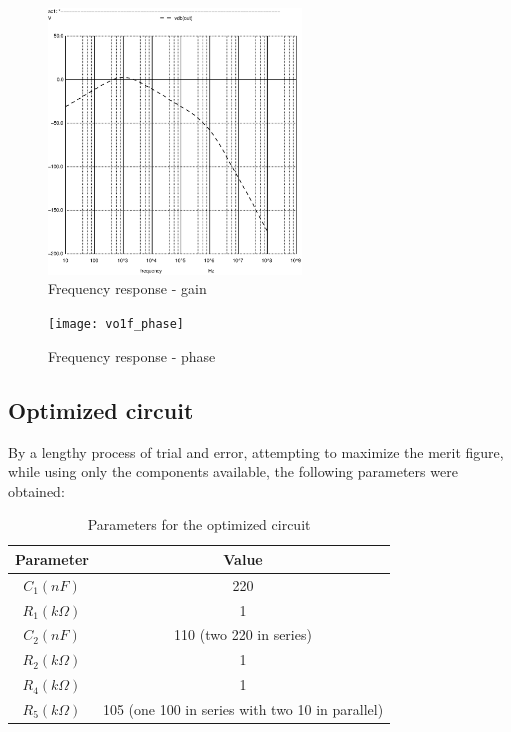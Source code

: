 \begin{figure}[H]
\centering
\includegraphics[width=0.6\textwidth]{vo1f}
\caption{Frequency response - gain}
\end{figure}

\begin{figure}[H]
\centering
\texttt{[image: vo1f\_phase]}
\caption{Frequency response - phase}
\end{figure}

\newpage

\subsection{Optimized circuit}

By a lengthy process of trial and error, attempting to maximize the merit figure, while using only the components available, the following parameters were obtained:

\begin{table}[H]
\centering
\begin{tabular}{|c|c|}
        \hline
        Parameter & Value \\
        \hline
        $C_1 (nF)$ & 220 \\
        $R_1 (k\Omega)$ & 1 \\
        $C_2 (nF)$ & 110 (two 220 in series) \\
        $R_2 (k\Omega)$ & 1 \\
        $R_4 (k\Omega)$ & 1 \\
        $R_5 (k\Omega)$ & 105 (one 100 in series with two 10 in parallel) \\
        \hline
\end{tabular}
\caption{Parameters for the optimized circuit}
\label{optimized_par}
\end{table}

